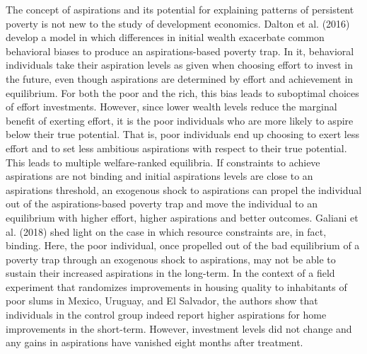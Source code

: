 \documentclass[11.5pt]{article}
\begin{document}
The concept of aspirations and its potential for explaining patterns of persistent poverty is not new to the study of development economics. Dalton et al. (2016) develop a model in which differences in initial wealth exacerbate common behavioral biases to produce an aspirations-based poverty trap. In it, behavioral individuals take their aspiration levels as given when choosing effort to invest in the future, even though aspirations are determined by effort and achievement in equilibrium. For both the poor and the rich, this bias leads to suboptimal choices of effort investments. However, since lower wealth levels reduce the marginal benefit of exerting effort, it is the poor individuals who are more likely to aspire below their true potential. That is, poor individuals end up choosing to exert less effort and to set less ambitious aspirations with respect to their true potential. This leads to multiple welfare-ranked equilibria. If constraints to achieve aspirations are not binding and initial aspirations levels are close to an aspirations threshold, an exogenous shock to aspirations can propel the individual out of the aspirations-based poverty trap and move the individual to an equilibrium with higher effort, higher aspirations and better outcomes. Galiani et al. (2018) shed light on the case in which resource constraints are, in fact, binding. Here, the poor individual, once propelled out of the bad equilibrium of a poverty trap through an exogenous shock to aspirations, may not be able to sustain their increased aspirations in the long-term. In the context of a field experiment that randomizes improvements in housing quality to inhabitants of poor slums in Mexico, Uruguay, and El Salvador, the authors show that individuals in the control group indeed report higher aspirations for home improvements in the short-term. However, investment levels did not change and any gains in aspirations have vanished eight months after treatment.
\end{document}
